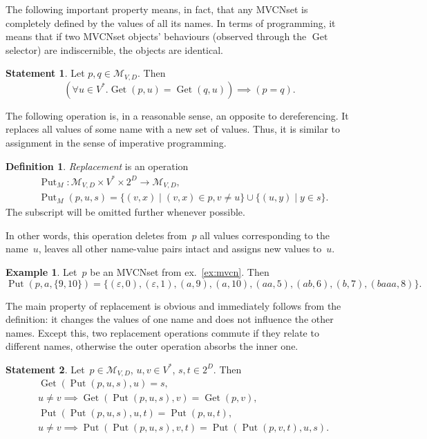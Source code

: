 \documentclass{article}
\theoremstyle{definition}
\newtheorem{Df}{Definition}
\newtheorem{St}{Statement}
\newtheorem{Ex}{Example}
\newcommand{\setcharmvcn}{M}
\newcommand{\setsymbol}[3]{\mathcal{#1}_{#2,#3}}
\newcommand{\setmvcn}[2]{\setsymbol{\setcharmvcn}{#1}{#2}}
\newcommand{\deref}{\operatorname{Get}}
\newcommand{\putval}{\operatorname{Put}}
\begin{document}
The following important property means, in fact, that any MVCNset is completely
defined by the values of all its names.  In terms of programming, it means that
if two MVCNset objects' behaviours (observed through the $\deref$ selector) are
indiscernible, the objects are identical.
\begin{St}\label{st:mvcn-deref-equality}
Let $p, q \in \setmvcn{V}{D}$. Then
\[
  (\forall u\in V^\ast . \deref(p,u) = \deref(q,u)) \implies (p = q) .
\]
\end{St}

The following operation is, in a reasonable sense, an opposite to
dereferencing.  It replaces all values of some name with a new set of values.
Thus, it is similar to assignment in the sense of imperative programming.
\begin{Df}\label{df:mvcn-replace}
\emph{Replacement} is an operation
\begin{eqnarray*}
 & \putval_\setcharmvcn :
    \setmvcn{V}{D} \times V^\ast \times 2^D \to \setmvcn{V}{D}, \\
 & \putval_\setcharmvcn(p, u, s) =
      \{ (v, x) \mid (v, x) \in p, v \neq u \} \cup
      \{ (u, y) \mid y \in s \} .
\end{eqnarray*}
The subscript will be omitted further whenever possible.
\end{Df}
In other words, this operation deletes from~$p$ all values corresponding to
the name~$u$, leaves all other name-value pairs intact and assigns new values
to~$u$.

\begin{Ex}\label{ex:mvcn-replace}
Let~$p$ be an MVCNset from ex.~\ref{ex:mvcn}. Then
\[
  \putval(p, a, \{ 9, 10 \}) = \{
    (\varepsilon, 0),
    (\varepsilon, 1),
    (a,           9),
    (a,           10),
    (aa,          5),
    (ab,          6),
    (b,           7),
    (baaa,        8)
  \} .
\]
\end{Ex}

The main property of replacement is obvious and immediately follows from the
definition: it changes the values of one name and does not influence the other
names. Except this, two replacement operations commute if they
relate to different names, otherwise the outer operation absorbs the inner one.
\begin{St}\label{st:mvcn-replace-deref}
Let~$p \in \setmvcn{V}{D}$, $u, v \in V^\ast$, $s, t \in 2^D$. Then
\begin{eqnarray*}
  & \deref(\putval(p, u, s), u) = s , \\
  & u \neq v \implies \deref(\putval(p, u, s), v) = \deref(p, v) , \\
  & \putval(\putval(p, u, s), u, t) = \putval(p, u, t) , \\
  & u \neq v \implies \putval(\putval(p, u, s), v, t) = \putval(\putval(p, v, t), u, s) .
\end{eqnarray*}
\end{St}
\end{document}
